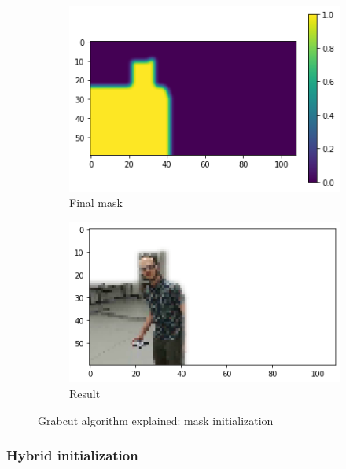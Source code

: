 \begin{figure}[!h]
\begin{center}
\begin{subfigure}[h]{0.24\textwidth}
			\includegraphics[width=1\textwidth]{"contents/images/04-2grabcut-2mask-steps-3"}
			\caption[]{Final mask}
			\label{fig:grabcut-mask-explain-3}
		\end{subfigure}
		\hfill
		\begin{subfigure}[h]{0.24\textwidth}
			\centering
			\includegraphics[width=1\textwidth]{"contents/images/04-2grabcut-2mask-steps-4"}
			\caption[]{Result}
			\label{fig:grabcut-mask-explain-4}
		\end{subfigure}
		\hfill
	\end{center}
	\vspace{-0.5cm}
	\caption[Grabcut algorithm explained: mask initialization]{Grabcut algorithm explained: mask initialization}
	\label{fig:grabcut-mask-explain}
\end{figure}


\subsubsection{Hybrid initialization}
\label{subsec:masking-grabcut-hybrid}

